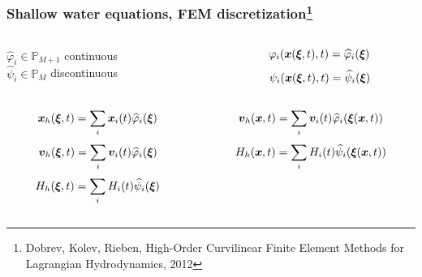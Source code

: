 \documentclass[pt12]{beamer}
\newcommand{\uvec}[2][3]{\boldsymbol{#2\mkern-#1mu}\mkern#1mu}
\newcommand{\hphi}[0]{\widehat{\varphi}}
\newcommand{\hpsi}[0]{\widehat{\psi}}
\begin{document}
\begin{frame}
\frametitle{Shallow water equations, FEM discretization\footnote{Dobrev, Kolev, Rieben, High-Order Curvilinear Finite Element Methods for Lagrangian Hydrodynamics, 2012}}

    \begin{columns}

        \begin{column}{0.50\textwidth}
\quad $\hphi_i\in \mathbb{P}_{M+1}$ continuous\\
\quad $\hpsi_i\in \mathbb{P}_{M}$ \quad discontinuous
        \end{column}
        \begin{column}{0.50\textwidth}
$$\varphi_i(\uvec{x}(\uvec{\xi},t),t)=\hphi_i(\uvec{\xi})$$
$$\psi_i(\uvec{x}(\uvec{\xi},t),t)=\hpsi_i(\uvec{\xi})$$
        \end{column}
    \end{columns}

\vspace{1cm}

    \begin{columns}

        \begin{column}{0.50\textwidth}
$$\uvec{x}_h(\uvec{\xi},t)=\sum_i\uvec{x}_i(t)\hphi_i(\uvec{\xi})$$
$$\uvec{v}_h(\uvec{\xi},t)=\sum_i\uvec{v}_i(t)\hphi_i(\uvec{\xi})$$
$$H_h(\uvec{\xi},t)=\sum_i H_i(t)\hpsi_i(\uvec{\xi})$$
        \end{column}
        \begin{column}{0.50\textwidth}
$$\uvec{v}_h(\uvec{x},t)=\sum_i\uvec{v}_i(t)\hphi_i(\uvec{\xi}(\uvec{x},t))$$
$$H_h(\uvec{x},t)=\sum_i H_i(t)\hpsi_i(\uvec{\xi}(\uvec{x},t))$$
        \end{column}
    \end{columns}


\end{frame}
\end{document}
